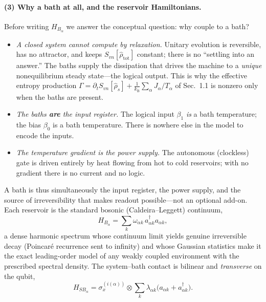 \documentclass[11pt,a4paper]{article}
\theoremstyle{definition}
\theoremstyle{remark}
\newcommand{\kB}{k_{\mathrm{B}}}
\begin{document}
\paragraph{(3) Why a bath at all, and the reservoir Hamiltonians.}
Before writing $H_{B_\alpha}$ we answer the conceptual question: why
couple to a bath?
\begin{itemize}
\item \emph{A closed system cannot compute by relaxation.} Unitary
evolution is reversible, has no attractor, and keeps
$S_{vn}[\hat\rho_{\mathrm{tot}}]$ constant; there is no ``settling into
an answer.'' The baths supply the dissipation that drives the machine
to a \emph{unique} nonequilibrium steady state---the logical output.
This is why the effective entropy production
$\Gamma=\partial_t S_{vn}[\hat\rho_s]+\tfrac{1}{\kB}\sum_\alpha
J_\alpha/T_\alpha$ of Sec.~1.1 is nonzero only when the baths are
present.
\item \emph{The baths \textbf{are} the input register.} The logical
input $\beta_1$ \emph{is} a bath temperature; the bias $\beta_0$ is a
bath temperature. There is nowhere else in the model to encode the
inputs.
\item \emph{The temperature gradient is the power supply.} The
autonomous (clockless) gate is driven entirely by heat flowing from hot
to cold reservoirs; with no gradient there is no current and no logic.
\end{itemize}
A bath is thus simultaneously the input register, the power supply, and
the source of irreversibility that makes readout possible---not an
optional add-on. Each reservoir is the standard bosonic (Caldeira--Leggett)
continuum,
\begin{equation}
H_{B_\alpha}=\sum_k \omega_{\alpha k}\,a_{\alpha k}^\dagger a_{\alpha k},
\label{eq:HB}
\end{equation}
a dense harmonic spectrum whose continuum limit yields genuine
irreversible decay (Poincaré recurrence sent to infinity) and whose
Gaussian statistics make it the exact leading-order model of any weakly
coupled environment with the prescribed spectral density. The
system--bath contact is bilinear and \emph{transverse} on the qubit,
\begin{equation}
H_{SB_\alpha}=\sigma_x^{(i(\alpha))}\otimes
\sum_k \lambda_{\alpha k}\big(a_{\alpha k}+a_{\alpha k}^\dagger\big).
\label{eq:HSB}
\end{equation}
\end{document}
